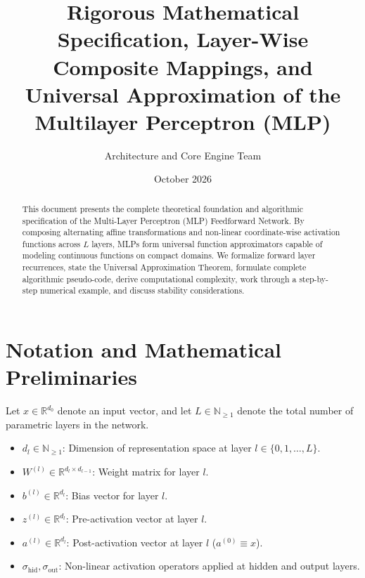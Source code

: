 \documentclass[11pt,a4paper]{article}
\title{\textbf{Rigorous Mathematical Specification, Layer-Wise Composite Mappings, and Universal Approximation of the Multilayer Perceptron (MLP)}}
\author{Architecture and Core Engine Team}
\date{October 2026}
\theoremstyle{definition}
\begin{document}
\maketitle

\begin{abstract}
This document presents the complete theoretical foundation and algorithmic specification of the Multi-Layer Perceptron (MLP) Feedforward Network. By composing alternating affine transformations and non-linear coordinate-wise activation functions across $L$ layers, MLPs form universal function approximators capable of modeling continuous functions on compact domains. We formalize forward layer recurrences, state the Universal Approximation Theorem, formulate complete algorithmic pseudo-code, derive computational complexity, work through a step-by-step numerical example, and discuss stability considerations.
\end{abstract}

\section{Notation and Mathematical Preliminaries}

Let $x \in \mathbb{R}^{d_0}$ denote an input vector, and let $L \in \mathbb{N}_{\ge 1}$ denote the total number of parametric layers in the network.

\begin{itemize}
    \item $d_l \in \mathbb{N}_{\ge 1}$: Dimension of representation space at layer $l \in \{0, 1, \dots, L\}$.
    \item $W^{(l)} \in \mathbb{R}^{d_l \times d_{l-1}}$: Weight matrix for layer $l$.
    \item $b^{(l)} \in \mathbb{R}^{d_l}$: Bias vector for layer $l$.
    \item $z^{(l)} \in \mathbb{R}^{d_l}$: Pre-activation vector at layer $l$.
    \item $a^{(l)} \in \mathbb{R}^{d_l}$: Post-activation vector at layer $l$ ($a^{(0)} \equiv x$).
    \item $\sigma_{\text{hid}}, \sigma_{\text{out}}$: Non-linear activation operators applied at hidden and output layers.
\end{itemize}
\end{document}

